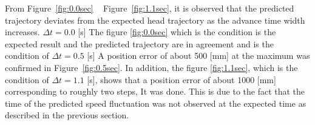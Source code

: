 \documentclass{sigchi}
\begin{document}

From Figure~\ref{fig:0.0sec} ~ Figure~\ref{fig:1.1sec}, it is observed that the predicted trajectory deviates from the expected head trajectory as the advance time width increases. $ \Delta t = 0.0 $ [s] The figure \ref{fig:0.0sec} which is the condition is the expected result and the predicted trajectory are in agreement and is the condition of $ \Delta t = 0.5 $ [s] A position error of about 500 [mm] at the maximum was confirmed in Figure~\ref{fig:0.5sec}. In addition, the figure \ref{fig:1.1sec}, which is the condition of $ \Delta t = 1.1 $ [s], shows that a position error of about 1000 [mm] corresponding to roughly two steps, It was done. This is due to the fact that the time of the predicted speed fluctuation was not observed at the expected time as described in the previous section.

\end{document}
